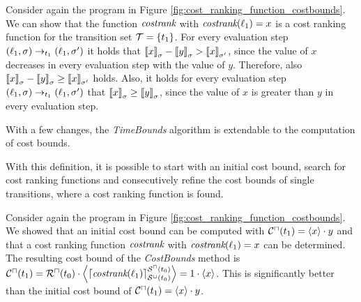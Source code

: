\begin{example}
  Consider again the program in Figure \ref{fig:cost_ranking_function_costbounds}.
  We can show that the function $\emph{costrank}$ with $\emph{costrank}(\ell_1) = x$ is a cost ranking function for the transition set $\mathcal{T} = \lbrace t_1 \rbrace$.
  For every evaluation step $(\ell_1,\sigma) \rightarrow_{t_1} (\ell_1,\sigma')$ it holds that $\left\llbracket x \right\rrbracket_{\sigma} - \left\llbracket y \right\rrbracket_{\sigma} > \left\llbracket x \right\rrbracket_{\sigma'}$, since the value of $x$ decreases in every evaluation step with the value of $y$.
  Therefore, also $\left\llbracket x \right\rrbracket_{\sigma} - \left\llbracket y \right\rrbracket_{\sigma} \geq \left\llbracket x \right\rrbracket_{\sigma'}$ holds.
  Also, it holds for every evaluation step $(\ell_1,\sigma) \rightarrow_{t_1} (\ell_1,\sigma')$ that $\left\llbracket x \right\rrbracket_{\sigma} \geq \left\llbracket y \right\rrbracket_{\sigma}$, since the value of $x$ is greater than $y$ in every evaluation step.
\end{example}

With a few changes, the \emph{TimeBounds} algorithm is extendable to the computation of cost bounds.



With this definition, it is possible to start with an initial cost bound, search for cost ranking functions and consecutively refine the cost bounds of single transitions, where a cost ranking function is found.

\begin{example}
  Consider again the program in Figure \ref{fig:cost_ranking_function_costbounds}.
  We showed that an initial cost bound can be computed with ${\mathcal{C}^\sqcap}(t_1) = \left\langle x \right\rangle \cdot y$ and that a cost ranking function $\emph{costrank}$ with $\emph{costrank}(\ell_1) = x$ can be determined.
  The resulting cost bound of the \emph{CostBounds} method is ${\mathcal{C}^\sqcap}(t_1) = {\mathcal{R}^\sqcap}(t_0) \cdot \left\langle \left\lceil \emph{costrank}(\ell_1) \right\rceil^{{\mathcal{S}^\sqcap}(t_0)}_{{\mathcal{S}^\sqcup}(t_0)} \right\rangle = 1 \cdot \left\langle x \right\rangle$.
  This is significantly better than the initial cost bound of ${\mathcal{C}^\sqcap}(t_1) = \left\langle x \right\rangle \cdot y$.
\end{example}

